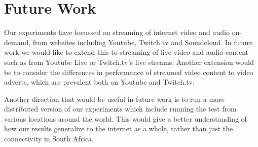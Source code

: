 \documentclass{sig-alternate-05-2015}
\begin{document}
\section{Future Work}\label{sec:futurework}
Our experiments have focussed on streaming of internet video and audio on-demand, from websites including Youtube, Twitch.tv and Soundcloud. In future work we would like to extend this to streaming of live video and audio content such as from Youtube Live or Twitch.tv's live streams. Another extension would be to consider the differences in performance of streamed video content to video adverts, which are prevalent both on Youtube and Twitch.tv.

Another direction that would be useful in future work is to run a more distributed version of our experiments which include running the test from various locations around the world. This would give a better understanding of how our results generalize to the internet as a whole, rather than just the connectivity in South Africa.

\small


\end{document}
